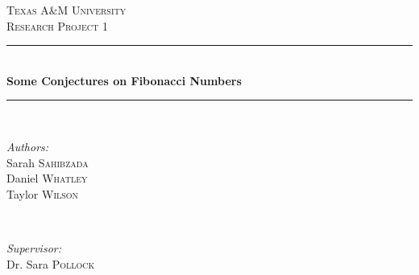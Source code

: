 \documentclass[11pt]{article}
\begin{document}



\begin{titlepage}

\newcommand{\HRule}{\rule{\linewidth}{0.5mm}} 

\center %
 

\textsc{\LARGE Texas A$\&$M University}\\[1.5cm] 
\textsc{\Large Research Project 1}\\[0.5cm] %


\HRule \\[0.4cm]
{ \huge \bfseries Some Conjectures on Fibonacci Numbers }\\[0.4cm]  %
\HRule \\[1.5cm]
 

\begin{minipage}{0.4\textwidth}
\begin{flushleft} \large
\emph{Authors:}\\
Sarah \textsc{Sahibzada}\\
Daniel \textsc{Whatley}\\
Taylor \textsc{Wilson}
\end{flushleft}
\end{minipage}
~
\begin{minipage}{0.4\textwidth}
\begin{flushright} \large
\emph{Supervisor:} \\
Dr. Sara \textsc{Pollock} 
\end{flushright}
\end{minipage}\\[4cm]



\end{titlepage}
\end{document}
